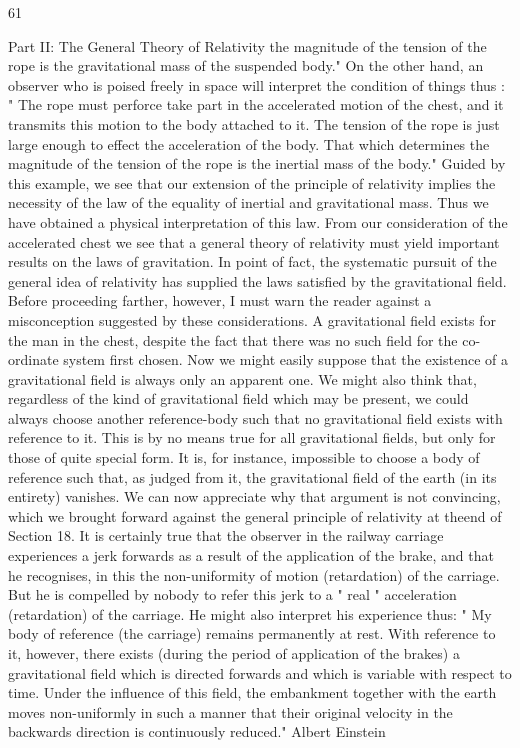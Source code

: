 \documentclass{article}
\begin{document}
61

Part II: The General Theory of Relativity
the magnitude of the tension of the rope is the gravitational mass of the suspended body."
On the other hand, an observer who is poised freely in space will interpret the condition of
things thus : " The rope must perforce take part in the accelerated motion of the chest, and it
transmits this motion to the body attached to it. The tension of the rope is just large enough
to effect the acceleration of the body. That which determines the magnitude of the tension
of the rope is the inertial mass of the body." Guided by this example, we see that our
extension of the principle of relativity implies the necessity of the law of the equality of
inertial and gravitational mass. Thus we have obtained a physical interpretation of this law.
From our consideration of the accelerated chest we see that a general theory of relativity
must yield important results on the laws of gravitation. In point of fact, the systematic
pursuit of the general idea of relativity has supplied the laws satisfied by the gravitational
field. Before proceeding farther, however, I must warn the reader against a misconception
suggested by these considerations. A gravitational field exists for the man in the chest,
despite the fact that there was no such field for the co-ordinate system first chosen. Now we
might easily suppose that the existence of a gravitational field is always only an apparent
one. We might also think that, regardless of the kind of gravitational field which may be
present, we could always choose another reference-body such that no gravitational field
exists with reference to it. This is by no means true for all gravitational fields, but only for
those of quite special form. It is, for instance, impossible to choose a body of reference such
that, as judged from it, the gravitational field of the earth (in its entirety) vanishes.
We can now appreciate why that argument is not convincing, which we brought forward
against the general principle of relativity at theend of Section 18. It is certainly true that the
observer in the railway carriage experiences a jerk forwards as a result of the application of
the brake, and that he recognises, in this the non-uniformity of motion (retardation) of the
carriage. But he is compelled by nobody to refer this jerk to a " real " acceleration
(retardation) of the carriage. He might also interpret his experience thus: " My body of
reference (the carriage) remains permanently at rest. With reference to it, however, there
exists (during the period of application of the brakes) a gravitational field which is directed
forwards and which is variable with respect to time. Under the influence of this field, the
embankment together with the earth moves non-uniformly in such a manner that their
original velocity in the backwards direction is continuously reduced."
Albert Einstein
\end{document}
